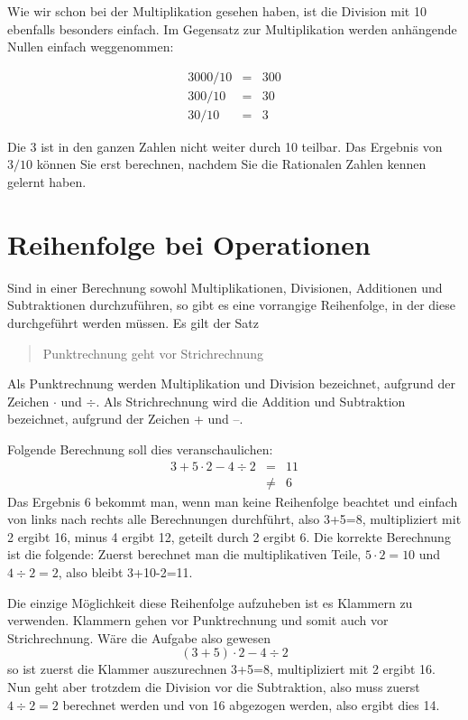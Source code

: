 Wie wir schon bei der Multiplikation gesehen haben, ist die Division mit 10 ebenfalls besonders einfach. Im Gegensatz zur Multiplikation werden anhängende Nullen einfach weggenommen:

\begin{eqnarray*}
3000 / 10 &=& 300 \\
300 / 10 &=& 30 \\
30 / 10 &=& 3
\end{eqnarray*}

Die 3 ist in den ganzen Zahlen nicht weiter durch 10 teilbar. Das Ergebnis von $3/10$ können Sie erst berechnen, nachdem Sie die Rationalen Zahlen kennen gelernt haben. 

\section{Reihenfolge bei Operationen}

Sind in einer Berechnung sowohl Multiplikationen, Divisionen, Additionen und Subtraktionen durchzuführen, so gibt es eine vorrangige Reihenfolge, in der diese durchgeführt werden müssen. Es gilt der Satz

\begin{quote}
Punktrechnung geht vor Strichrechnung
\end{quote}

\noindent Als Punktrechnung werden Multiplikation und Division bezeichnet, aufgrund der Zeichen $\cdot$ und $\div$. Als Strichrechnung wird die Addition und Subtraktion bezeichnet, aufgrund der Zeichen + und --.

Folgende Berechnung soll dies veranschaulichen:
\begin{eqnarray*}
3+5\cdot 2-4\div 2 &=&  11 \\
&\ne & 6
\end{eqnarray*}
Das Ergebnis 6 bekommt man, wenn man keine Reihenfolge beachtet und einfach von links nach rechts alle Berechnungen durchführt, also 3+5=8, multipliziert mit 2 ergibt 16, minus 4 ergibt 12, geteilt durch 2 ergibt 6. Die korrekte Berechnung ist die folgende: Zuerst berechnet man die multiplikativen Teile, $5\cdot 2=10$ und $4\div 2=2$, also bleibt 3+10-2=11.

Die einzige Möglichkeit diese Reihenfolge aufzuheben ist es Klammern zu verwenden. Klammern gehen vor Punktrechnung und somit auch vor Strichrechnung. Wäre die Aufgabe also gewesen
\[
(3+5)\cdot 2-4\div 2
\]
so ist zuerst die Klammer auszurechnen 3+5=8, multipliziert mit 2 ergibt 16. Nun geht aber trotzdem die Division vor die Subtraktion, also muss zuerst $4\div 2=2$ berechnet werden und von 16 abgezogen werden, also ergibt dies 14.

